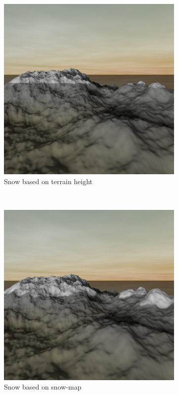 \documentclass{article}
\begin{document}
\begin{figure}[H]
\centering
    \begin{subfigure}[b]{0.45\textwidth}
        \centering
        \includegraphics[scale=0.25]{snowPlain}
        \caption{Snow based on terrain height}
        \label{fig:snowPlain}
    \end{subfigure}
    ~
    \begin{subfigure}[b]{0.45\textwidth}
        \centering
        \includegraphics[scale=0.25]{snowProb}
        \caption{Snow based on snow-map}
        \label{fig:snowProb}
    \end{subfigure}
    \caption{}
    \label{fig:snowPlainProb}
\end{figure}
\end{document}
